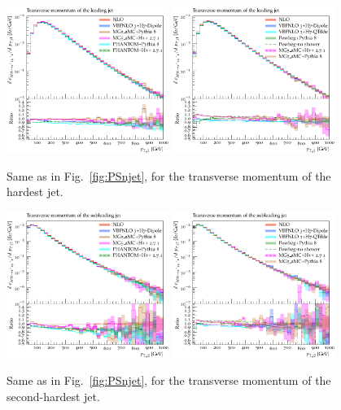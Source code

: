 \begin{figure}[hbt]
\centering
\includegraphics[width=0.47\textwidth]{figures/LOPS/pT_j1.pdf}
\includegraphics[width=0.47\textwidth]{figures/NLOPS/pT_j1.pdf}
\caption{Same as in Fig.~\protect\ref{fig:PSnjet}, for the transverse momentum of the hardest jet.}
\label{fig:PSpt1}
\end{figure}

\begin{figure}[hbt]
\centering
\includegraphics[width=0.47\textwidth]{figures/LOPS/pT_j2.pdf}
\includegraphics[width=0.47\textwidth]{figures/NLOPS/pT_j2.pdf}
\caption{Same as in Fig.~\protect\ref{fig:PSnjet}, for the transverse momentum of the second-hardest jet.}
\label{fig:PSpt2}
\end{figure}


